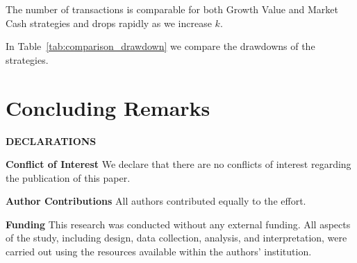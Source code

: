 \documentclass{article}
\begin{document}
The number of transactions is comparable for both Growth Value and 
Market Cash strategies and drops rapidly as we increase
$k$. 








\begin{comment}
The results are presented in Table~\ref{tab_comparison}.
S{\&}P refers to the Standard \& Poor's 500 Index. Growth and Value represent Buy-Hold for SPYG and SPYV indices respectively.
"$\max$" and "$\min$" strategies are based on selecting the higher growth or value from the previous day. Finally, 5-year, 3-year, and 1-year indicate the training periods of five, three, and one year, respectively.

In Table~\ref{tab_comparison_example}, each strategy's performance is symbolized as follows: 'G' for Growth, indicating an investment in SPYG, and 'V' for Value, indicating an investment in SPYV. The 'Label' column classifies daily market outcomes based on the comparative performance of SPYV versus SPYG; a '+' label indicates a day where SPYV outperformed SPYG, and a '-' label signifies the reverse.The 'Winner' and 'Loser' 
columns are derived from the prior day's data (hence 'N/A' for the initial date), 

\end{comment}


In Table~\ref{tab:comparison_drawdown} we compare the drawdowns of the strategies.







\section{Concluding Remarks}\label{section_concluding_remarks}




\medskip
\medskip
\medskip
\medskip
\noindent
{\bf DECLARATIONS}

\medskip
\noindent
{\bf Conflict of Interest}
We declare that there are no conflicts of interest regarding the publication of this paper.

\medskip
\noindent
{\bf Author Contributions}
All authors contributed equally to the effort.

\medskip
\noindent
{\bf Funding}
This research was conducted without any external funding. All aspects of the study, including design, data collection, analysis, and interpretation, were carried out using the resources available within the authors' institution.
\end{document}

